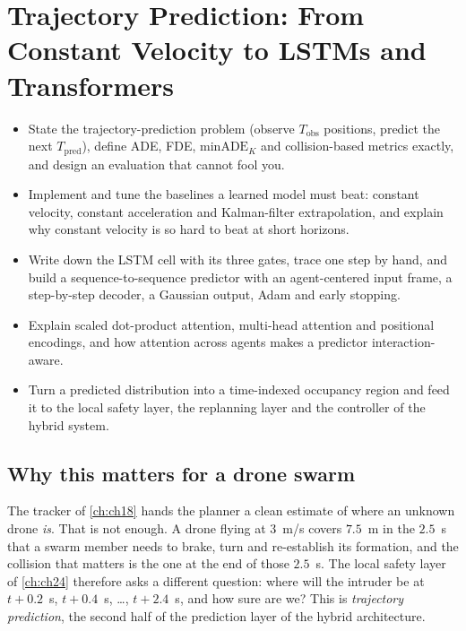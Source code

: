 \chapter{Trajectory Prediction: From Constant Velocity to LSTMs and Transformers}
\label{ch:ch20}

\begin{objectives}
\begin{itemize}
  \item State the trajectory-prediction problem (observe $T_{\mathrm{obs}}$ positions, predict the next $T_{\mathrm{pred}}$), define ADE, FDE, $\mathrm{minADE}_K$ and collision-based metrics exactly, and design an evaluation that cannot fool you.
  \item Implement and tune the baselines a learned model must beat: constant velocity, constant acceleration and Kalman-filter extrapolation, and explain why constant velocity is so hard to beat at short horizons.
  \item Write down the LSTM cell with its three gates, trace one step by hand, and build a sequence-to-sequence predictor with an agent-centered input frame, a step-by-step decoder, a Gaussian output, Adam and early stopping.
  \item Explain scaled dot-product attention, multi-head attention and positional encodings, and how attention across agents makes a predictor interaction-aware.
  \item Turn a predicted distribution into a time-indexed occupancy region and feed it to the local safety layer, the replanning layer and the controller of the hybrid system.
\end{itemize}
\end{objectives}

\section{Why this matters for a drone swarm}
\label{sec:ch20-motivation}

The tracker of \cref{ch:ch18} hands the planner a clean estimate of where an
unknown drone \emph{is}. That is not enough. A drone flying at $3$~m/s covers
$7.5$~m in the $2.5$~s that a swarm member needs to brake, turn and
re-establish its formation, and the collision that matters is the one at the
end of those $2.5$~s. The local safety layer of \cref{ch:ch24} therefore asks
a different question: where will the intruder be at $t + 0.2$~s, $t + 0.4$~s,
\dots, $t + 2.4$~s, and how sure are we? This is \emph{trajectory
prediction}, the second half of the prediction layer of the hybrid
architecture.

